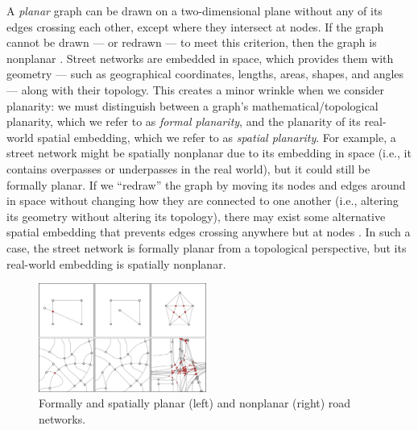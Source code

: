 \documentclass[Afour,sageh,times]{sagej}
\begin{document}
A \emph{planar} graph can be drawn on a two-dimensional plane without any of its edges crossing each other, except where they intersect at nodes. If the graph cannot be drawn --- or redrawn --- to meet this criterion, then the graph is nonplanar \citep{trudeau_introduction_1994}. Street networks are embedded in space, which provides them with geometry --- such as geographical coordinates, lengths, areas, shapes, and angles --- along with their topology. This creates a minor wrinkle when we consider planarity: we must distinguish between a graph's mathematical/topological planarity, which we refer to as \emph{formal planarity}, and the planarity of its real-world spatial embedding, which we refer to as \emph{spatial planarity}. For example, a street network might be spatially nonplanar due to its embedding in space (i.e., it contains overpasses or underpasses in the real world), but it could still be formally planar. If we \enquote{redraw} the graph by moving its nodes and edges around in space without changing how they are connected to one another (i.e., altering its geometry without altering its topology), there may exist some alternative spatial embedding that prevents edges crossing anywhere but at nodes \citep[for a thorough introduction see][p.~6]{barthelemy_morphogenesis_2017}. In such a case, the street network is formally planar from a topological perspective, but its real-world embedding is spatially nonplanar.

\begin{figure}[tbp]
	\center
	\includegraphics[width=0.49\textwidth]{figures_tables/planar_vs_not.png}
	\caption{Formally and spatially planar (left) and nonplanar (right) road networks.}
	\label{fig:planar_vs_not}
\end{figure}
\end{document}
